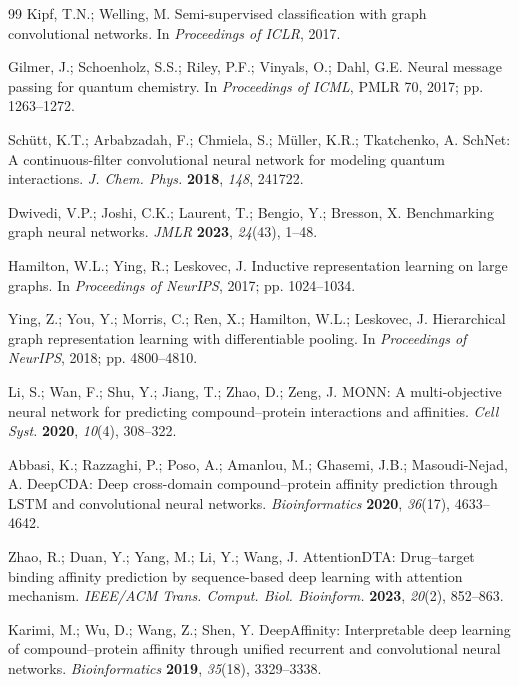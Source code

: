 \documentclass[10pt,a4paper,twocolumn]{article}
\begin{document}
\begin{thebibliography}{99}
Kipf, T.N.; Welling, M. Semi-supervised classification with graph convolutional networks. In \textit{Proceedings of ICLR}, 2017.


Gilmer, J.; Schoenholz, S.S.; Riley, P.F.; Vinyals, O.; Dahl, G.E. Neural message passing for quantum chemistry. In \textit{Proceedings of ICML}, PMLR 70, 2017; pp. 1263--1272.


Schütt, K.T.; Arbabzadah, F.; Chmiela, S.; Müller, K.R.; Tkatchenko, A. SchNet: A continuous-filter convolutional neural network for modeling quantum interactions. \textit{J. Chem. Phys.} \textbf{2018}, \textit{148}, 241722.


Dwivedi, V.P.; Joshi, C.K.; Laurent, T.; Bengio, Y.; Bresson, X. Benchmarking graph neural networks. \textit{JMLR} \textbf{2023}, \textit{24}(43), 1--48.


Hamilton, W.L.; Ying, R.; Leskovec, J. Inductive representation learning on large graphs. In \textit{Proceedings of NeurIPS}, 2017; pp. 1024--1034.


Ying, Z.; You, Y.; Morris, C.; Ren, X.; Hamilton, W.L.; Leskovec, J. Hierarchical graph representation learning with differentiable pooling. In \textit{Proceedings of NeurIPS}, 2018; pp. 4800--4810.


Li, S.; Wan, F.; Shu, Y.; Jiang, T.; Zhao, D.; Zeng, J. MONN: A multi-objective neural network for predicting compound--protein interactions and affinities. \textit{Cell Syst.} \textbf{2020}, \textit{10}(4), 308--322.


Abbasi, K.; Razzaghi, P.; Poso, A.; Amanlou, M.; Ghasemi, J.B.; Masoudi-Nejad, A. DeepCDA: Deep cross-domain compound--protein affinity prediction through LSTM and convolutional neural networks. \textit{Bioinformatics} \textbf{2020}, \textit{36}(17), 4633--4642.


Zhao, R.; Duan, Y.; Yang, M.; Li, Y.; Wang, J. AttentionDTA: Drug--target binding affinity prediction by sequence-based deep learning with attention mechanism. \textit{IEEE/ACM Trans. Comput. Biol. Bioinform.} \textbf{2023}, \textit{20}(2), 852--863.


Karimi, M.; Wu, D.; Wang, Z.; Shen, Y. DeepAffinity: Interpretable deep learning of compound--protein affinity through unified recurrent and convolutional neural networks. \textit{Bioinformatics} \textbf{2019}, \textit{35}(18), 3329--3338.



\end{thebibliography}
\end{document}
